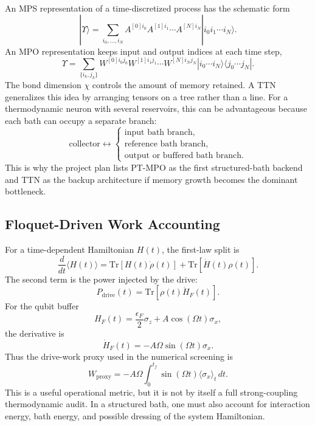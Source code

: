 \documentclass[11pt]{article}
\begin{document}
An MPS representation of a time-discretized process has the schematic form
\begin{equation}
    |\Upsilon\rangle
    =
    \sum_{i_0,\ldots,i_N}
    A^{[0]i_0}A^{[1]i_1}\cdots A^{[N]i_N}
    |i_0i_1\cdots i_N\rangle .
\end{equation}
An MPO representation keeps input and output indices at each time step,
\begin{equation}
    \Upsilon
    =
    \sum_{\{i_k,j_k\}}
    W^{[0]i_0j_0}W^{[1]i_1j_1}\cdots W^{[N]i_Nj_N}
    |i_0\cdots i_N\rangle\langle j_0\cdots j_N| .
\end{equation}
The bond dimension $\chi$ controls the amount of memory retained.  A TTN generalizes this
idea by arranging tensors on a tree rather than a line.  For a thermodynamic neuron with
several reservoirs, this can be advantageous because each bath can occupy a separate branch:
\begin{equation}
    \text{collector}
    \longleftrightarrow
    \begin{cases}
    \text{input bath branch},\\
    \text{reference bath branch},\\
    \text{output or buffered bath branch}.
    \end{cases}
\end{equation}
This is why the project plan lists PT-MPO as the first structured-bath backend and TTN as
the backup architecture if memory growth becomes the dominant bottleneck.

\subsection{Floquet-Driven Work Accounting}

For a time-dependent Hamiltonian $H(t)$, the first-law split is
\begin{equation}
    \frac{d}{dt}\langle H(t)\rangle
    =
    \mathrm{Tr}\!\left[H(t)\dot\rho(t)\right]
    +
    \mathrm{Tr}\!\left[\dot H(t)\rho(t)\right].
\end{equation}
The second term is the power injected by the drive:
\begin{equation}
    P_{\mathrm{drive}}(t)
    =
    \mathrm{Tr}\!\left[\rho(t)\dot H_F(t)\right].
\end{equation}
For the qubit buffer
\begin{equation}
    H_F(t)
    =
    \frac{\epsilon_F}{2}\sigma_z
    +
    A\cos(\Omega t)\sigma_x ,
\end{equation}
the derivative is
\begin{equation}
    \dot H_F(t)
    =
    -A\Omega\sin(\Omega t)\sigma_x .
\end{equation}
Thus the drive-work proxy used in the numerical screening is
\begin{equation}
    W_{\mathrm{proxy}}
    =
    -A\Omega\int_0^{t_f}
    \sin(\Omega t)
    \langle\sigma_x\rangle_t\,dt .
\end{equation}
This is a useful operational metric, but it is not by itself a full strong-coupling
thermodynamic audit.  In a structured bath, one must also account for interaction energy,
bath energy, and possible dressing of the system Hamiltonian.
\end{document}
